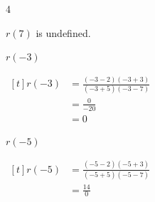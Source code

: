 \begin{exercises}
\begin{problem}
\begin{multicols}{4}
\begin{subproblem}
\begin{shortsolution}
				 $r(7)$ is undefined.
			 \end{shortsolution}
		 \end{subproblem}
		 \begin{subproblem}
			 $r(-3)$
			 \begin{shortsolution}
				 $\begin{aligned}[t]
						 r(-3) & =\frac{(-3-2)(-3+3)}{(-3+5)(-3-7)} \\
						       & =\frac{0}{-20}                     \\
						       & =0
					 \end{aligned}$
			 \end{shortsolution}
		 \end{subproblem}
		 \begin{subproblem}
			 $r(-5)$
			 \begin{shortsolution}
				 $\begin{aligned}[t]
						 r(-5) & =\frac{(-5-2)(-5+3)}{(-5+5)(-5-7)} \\
						       & =\frac{14}{0}
					 \end{aligned}$


\end{shortsolution}
\end{subproblem}
\end{multicols}
\end{problem}
\end{exercises}
